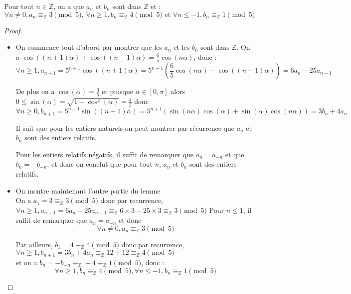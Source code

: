 \begin{lemma}\label{lemme3}
Pour tout $n \in \mathbb{Z}$, on a que $a_n$ et $b_n$ sont dans $\mathbb{Z}$ et :
$$\forall n \ne 0, a_n \equiv_\mathbb{Z} 3 \pmod 5 \text{, } \forall n \ge 1, b_n \equiv_\mathbb{Z} 4 \pmod 5 \text{ et } \forall n \le -1, b_n \equiv_\mathbb{Z} 1 \pmod 5$$\par
\end{lemma}

\begin{proof}
  \hfill
  \begin{itemize}
    \item On commence tout d'abord par montrer que les $a_n$ et les $b_n$ sont dans $\mathbb{Z}$. On a $\cos\left(\left(n+1\right)\alpha\right) + \cos\left(\left(n-1\right)\alpha\right) = \frac{6}{5}\cos\left(n\alpha\right)$,
  donc : $$\forall n \ge 1, a_{n+1} = 5^{ n+1 }\cos\left(\left(n+1\right)\alpha\right) = 5^{ n+1 }\left(\frac{6}{5}\cos\left(n\alpha\right)-\cos\left(\left(n-1\right)\alpha\right)\right)= 6a_n-25a_{n-1}$$\par
  De plus on a $\cos\left(\alpha\right) = \frac{3}{5}$ et puisque $\alpha \in [0, \pi]$ alors $0 \le \sin\left(\alpha\right) = \sqrt{1-\cos^2\left(\alpha\right)} = \frac{4}{5}$ donc
  $$\forall n \ge 0, b_{n+1}=5^{n+1 }\sin\left(\left(n+1\right)\alpha\right)=5^{n+1 }\left(\sin\left(n\alpha\right)\cos\left(\alpha\right)+\sin\left(\alpha\right)\cos\left(n\alpha\right)\right) = 3b_n +4a_n$$\par
  Il suit que pour les entiers naturels on peut montrer par récurrence que $a_n$ et $b_n$ sont des entiers relatifs.\par Pour les entiers relatifs négatifs, il suffit de remarquer que $a_n = a_{-n}$ et que $b_n = - b_{-n}$, et donc on conclut que pour tout $n$, $a_n$ et $b_n$ sont des entiers relatifs.\\


  \item On montre maintenant l'autre partie du lemme \\
  On a $a_1=3\equiv_\mathbb{Z} 3 \pmod 5$ donc par recurrence,  $\forall n \ge 1, a_{n+1} = 6a_n - 25a_{n-1} \equiv_\mathbb{Z} 6\times3 - 25\times3 \equiv_\mathbb{Z} 3 \pmod 5$ Pour $n \le 1$, il suffit de remarquer que $a_n = a_{-n}$ et donc  $$\forall n \ne 0, a_n \equiv_\mathbb{Z} 3 \pmod 5$$\par
  Par ailleurs, $b_1=4\equiv_\mathbb{Z} 4 \pmod 5$ donc par recurrence,  $\forall n \ge 1,b_{n+1}=3b_n+4a_n\equiv_\mathbb{Z} 12+12 \equiv_\mathbb{Z} 4 \pmod 5$\\
  et on a $b_{n}=-b_{-n} \equiv_\mathbb{Z} -4 \equiv_\mathbb{Z} 1 \pmod 5$, donc :$$\forall n \ge 1, b_n \equiv_\mathbb{Z} 4 \pmod 5, \forall n \le -1, b_n \equiv_\mathbb{Z} 1 \pmod 5$$\par
\end{itemize}
\end{proof}
